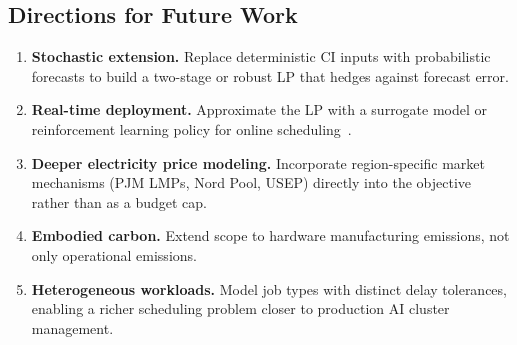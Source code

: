 \subsection{Directions for Future Work}

\begin{enumerate}[leftmargin=1.5em]
  \item \textbf{Stochastic extension.}
        Replace deterministic CI inputs with probabilistic forecasts to build a two-stage or robust LP that hedges against forecast error.
  \item \textbf{Real-time deployment.}
        Approximate the LP with a surrogate model or reinforcement learning policy for online scheduling~\cite{colangelo2025}.
  \item \textbf{Deeper electricity price modeling.}
        Incorporate region-specific market mechanisms (PJM LMPs, Nord Pool, USEP) directly into the objective rather than as a budget cap.
  \item \textbf{Embodied carbon.}
        Extend scope to hardware manufacturing emissions, not only operational emissions.
  \item \textbf{Heterogeneous workloads.}
        Model job types with distinct delay tolerances, enabling a richer scheduling problem closer to production AI cluster management.
\end{enumerate}

